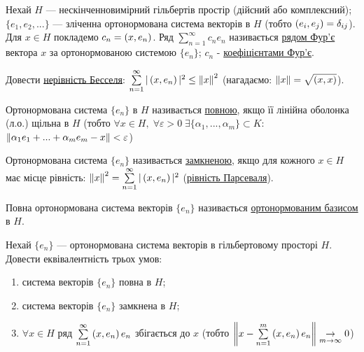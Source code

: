 
\begin{theory}
    Нехай $H$ --- нескінченновимірний гільбертів простір (дійсний або комплексний); 
    $\{e_1, e_2, ...\}$ --- зліченна ортонормована система векторів в $H$ (тобто $\left(e_i, e_j\right) 
    = \delta_{ij}$). Для $x \in H$ покладемо $c_n = \left(x, e_n\right)$. Ряд $\sum\limits_{n=1}^\infty 
    c_n e_n$ називається \underline{рядом Фур'є} вектора $x$ за ортонормованою системою 
    $\{e_n\}$; $c_n$ - \underline{коефіцієнтами Фур'є}.
\end{theory}

\begin{exercise}
    Довести \underline{нерівність Бесселя}: $\sum\limits_{n=1}^\infty |\left(x, e_n\right)|^2 \leq 
    \left\lVert x\right\rVert^2$ (нагадаємо: $\left\lVert x\right\rVert = \sqrt{\left(x, x\right)}$).
\end{exercise}

\begin{theory}
    
    Ортонормована система $\{e_n\}$ в $H$ називається \underline{повною}, якщо її лінійна 
    оболонка (л.о.) щільна в $H$ 
    (тобто $\forall x \in H, \;\forall \varepsilon > 0 \; \exists \{\alpha_1, ..., 
    \alpha_m\} \subset K$: $\left\lVert\alpha_1 e_1 + ... + \alpha_m e_m - x\right\rVert < \varepsilon$)

    Ортонормована система $\{e_n\}$ називається \underline{замкненою}, якщо для кожного 
    $x \in H$ має місце рівність: $\left\lVert x\right\rVert^2 = \sum\limits_{n=1}^\infty |\left(x, e_n\right)|^2$ 
    (\underline{рівність Парсеваля}).

    Повна ортонормована система векторів $\{e_n\}$ називається \uline{ортонормованим 
    базисом} в $H$.
\end{theory}

\begin{exercise}
    Нехай $\{e_n\}$ --- ортонормована система векторів в гільбертовому просторі $H$. 
    Довести еквівалентність трьох умов:
    \begin{enumerate}[label=\ukr*)]
        \item система векторів $\{e_n\}$ повна в $H$;
        \item система векторів $\{e_n\}$ замкнена в $H$;
        \item $\forall x \in H$ ряд $\sum\limits_{n=1}^\infty \left(x, e_n\right)e_n$ збігається до $x$
        (тобто $\left\lVert x - \sum\limits_{n=1}^m \left(x, e_n\right)e_n\right\rVert
        \underset{m\rightarrow\infty}{\rightarrow}0$)
    \end{enumerate}
\end{exercise}

